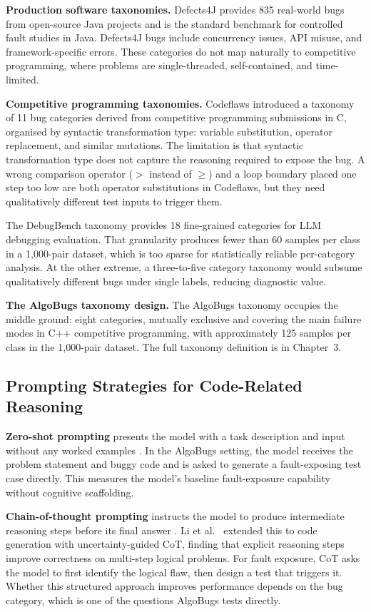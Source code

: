 \textbf{Production software taxonomies.} Defects4J \cite{just2014defects4j} provides 835 real-world bugs from open-source Java projects and is the standard benchmark for controlled fault studies in Java. Defects4J bugs include concurrency issues, API misuse, and framework-specific errors. These categories do not map naturally to competitive programming, where problems are single-threaded, self-contained, and time-limited.

\textbf{Competitive programming taxonomies.} Codeflaws \cite{tan2017codeflaws} introduced a taxonomy of 11 bug categories derived from competitive programming submissions in C, organised by syntactic transformation type: variable substitution, operator replacement, and similar mutations. The limitation is that syntactic transformation type does not capture the reasoning required to expose the bug. A wrong comparison operator ($>$ instead of $\geq$) and a loop boundary placed one step too low are both operator substitutions in Codeflaws, but they need qualitatively different test inputs to trigger them.

The DebugBench taxonomy provides 18 fine-grained categories for LLM debugging evaluation. That granularity produces fewer than 60 samples per class in a 1,000-pair dataset, which is too sparse for statistically reliable per-category analysis. At the other extreme, a three-to-five category taxonomy would subsume qualitatively different bugs under single labels, reducing diagnostic value.

\textbf{The AlgoBugs taxonomy design.} The AlgoBugs taxonomy occupies the middle ground: eight categories, mutually exclusive and covering the main failure modes in C++ competitive programming, with approximately 125 samples per class in the 1,000-pair dataset. The full taxonomy definition is in Chapter~3.

\subsection{Prompting Strategies for Code-Related Reasoning}

\textbf{Zero-shot prompting} presents the model with a task description and input without any worked examples \cite{learnprompting2025shot}. In the AlgoBugs setting, the model receives the problem statement and buggy code and is asked to generate a fault-exposing test case directly. This measures the model's baseline fault-exposure capability without cognitive scaffolding.

\textbf{Chain-of-thought prompting} instructs the model to produce intermediate reasoning steps before its final answer \cite{wei2022chain}. Li et al.\ \cite{li2025uncertainty} extended this to code generation with uncertainty-guided CoT, finding that explicit reasoning steps improve correctness on multi-step logical problems. For fault exposure, CoT asks the model to first identify the logical flaw, then design a test that triggers it. Whether this structured approach improves performance depends on the bug category, which is one of the questions AlgoBugs tests directly.

